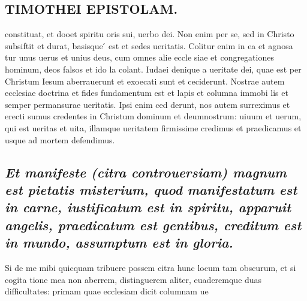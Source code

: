 \documentclass{article}
\begin{document}
\begin{pages}
\section*{TIMOTHEI EPISTOLAM. }
\marginpar{[ p.89 ]}\pstart constituat, et dooet spiritu oris sui, uerbo dei. Non enim per se, sed in Christo subsiftit et durat, basisque ́ est et sedes ueritatis. Colitur enim in ea et agnosa tur unus uerus et unius deus, cum omnes alie eccle siae et congregationes hominum, deos falsos et ido la colant. Iudaei denique a ueritate dei, quae est per Christum Iesum aberrauerunt et exoecati sunt et ceciderunt. Nostrae autem ecclesiae doctrina et fides fundamentum est et lapis et columna immobi lis et semper permansurae ueritatis. Ipsi enim ced derunt, nos autem surreximus et erecti sumus credentes in Christum dominum et deumnostrum: uiuum et uerum, qui est ueritas et uita, illamque ueritatem firmissime credimus et praedicamus et usque ad mortem defendimus.  \pend
{}
{}
\subsection*{\textit{Et manifeste (citra controuersiam) magnum est pietatis misterium, quod manifestatum est in carne, iustificatum est in spiritu, apparuit angelis, praedicatum est gentibus, creditum est in mundo, assumptum est in gloria. }}\pstart Si de me mibi quicquam tribuere possem citra hunc locum tam obscurum, et si cogita tione mea non aberrem, distinguerem aliter, euaderemque duas difficultates: primam quae ecclesiam dicit columnam ue  \pend

\end{pages}
\end{document}
